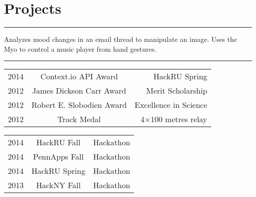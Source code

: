 \documentclass[letterpaper]{deedy-resume} %
\newcommand{\colorrule}[1]{%
\begingroup\color{#1}\hrule\endgroup%
}%
\begin{document}
\section{Projects}
\normalfont
\colorrule{black}
\vspace{2 mm}
\fontsize{10pt}{12pt}
Analyzes mood changes in an email thread to manipulate an image.
\hfill
{}
\hspace{2mm}
Uses the Myo to control a music player from hand gestures. 
\hfill
{}





\sectionspace

\hfill
{}
\vspace{1 mm}
\colorrule{black}
\normalfont
\vspace{2 mm}
\normalfont
\fontsize{10pt}{12pt}
\selectfont
\begin{minipage}[t]{0.66\textwidth}
\begin{tabular}{l|c|r}
2014 & Context.io API Award & HackRU Spring \\
2012 & James Dickson Carr Award& Merit Scholarship\\
2012 & Robert E. Slobodien Award& Excellence in Science\\   	
2012 & Track Medal & 4×100 metres relay\\

\end{tabular}
\end{minipage}
\begin{minipage}[t]{0.33\textwidth}
\hfill	
\begin{tabular}{l|c|r}
2014 & HackRU Fall & Hackathon\\
2014 & PennApps Fall & Hackathon\\ 
2014 & HackRU Spring & Hackathon\\
2013 & HackNY Fall   & Hackathon\\
\end{tabular}    
\end{minipage}
\end{document}
